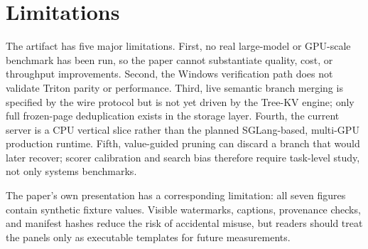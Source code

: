 \section{Limitations}

The artifact has five major limitations.  First, no real large-model or
GPU-scale benchmark has been run, so the paper cannot substantiate quality,
cost, or throughput improvements.  Second, the Windows verification path does
not validate Triton parity or performance.  Third, live semantic branch merging
is specified by the wire protocol but is not yet driven by the Tree-KV engine;
only full frozen-page deduplication exists in the storage layer.  Fourth, the
current server is a CPU vertical slice rather than the planned SGLang-based,
multi-GPU production runtime.  Fifth, value-guided pruning can discard a branch
that would later recover; scorer calibration and search bias therefore require
task-level study, not only systems benchmarks.

The paper's own presentation has a corresponding limitation: all seven figures
contain synthetic fixture values.  Visible watermarks, captions, provenance
checks, and manifest hashes reduce the risk of accidental misuse, but readers
should treat the panels only as executable templates for future measurements.
